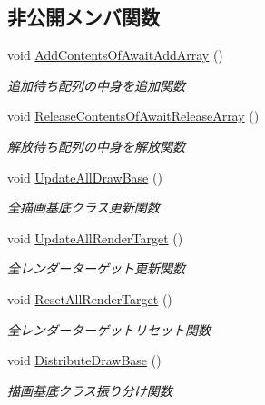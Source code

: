 \subsection*{非公開メンバ関数}
\begin{DoxyCompactItemize}
\item 
void \mbox{\hyperlink{class_draw_manager_a984cd9de288151fd1d170f80f93a11e8}{Add\+Contents\+Of\+Await\+Add\+Array}} ()
\begin{DoxyCompactList}\small\item\em 追加待ち配列の中身を追加関数 \end{DoxyCompactList}\item 
void \mbox{\hyperlink{class_draw_manager_a76361402a035f02084e9faf31e782d69}{Release\+Contents\+Of\+Await\+Release\+Array}} ()
\begin{DoxyCompactList}\small\item\em 解放待ち配列の中身を解放関数 \end{DoxyCompactList}\item 
void \mbox{\hyperlink{class_draw_manager_a7c989a2beae5de5a1fc7ab0bef8692f9}{Update\+All\+Draw\+Base}} ()
\begin{DoxyCompactList}\small\item\em 全描画基底クラス更新関数 \end{DoxyCompactList}\item 
void \mbox{\hyperlink{class_draw_manager_a8eb2f1e3957113ae99e8240c40c89744}{Update\+All\+Render\+Target}} ()
\begin{DoxyCompactList}\small\item\em 全レンダーターゲット更新関数 \end{DoxyCompactList}\item 
void \mbox{\hyperlink{class_draw_manager_a20787acc9c5a096e80651dc1909ae60d}{Reset\+All\+Render\+Target}} ()
\begin{DoxyCompactList}\small\item\em 全レンダーターゲットリセット関数 \end{DoxyCompactList}\item 
void \mbox{\hyperlink{class_draw_manager_a9a09cb524187bc11f1e4812a06fe46d6}{Distribute\+Draw\+Base}} ()
\begin{DoxyCompactList}\small\item\em 描画基底クラス振り分け関数 \end{DoxyCompactList}\end{DoxyCompactItemize}
